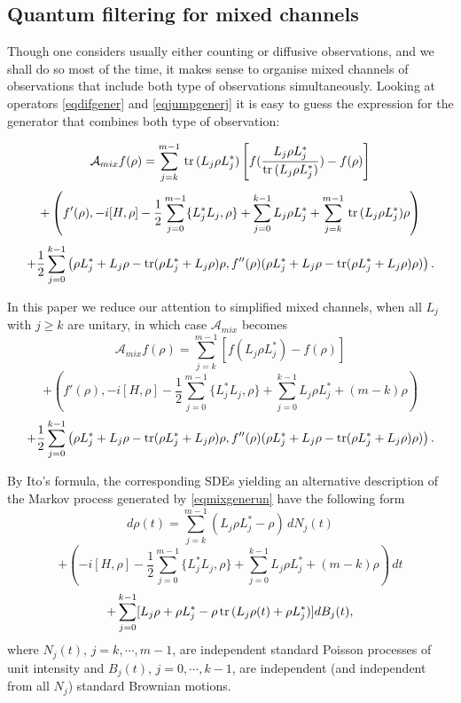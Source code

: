\documentclass[12pt]{article}
\def\AC{\mathcal{A}}
\def\tr{\rm{tr}}
\begin{document}
\subsection{Quantum filtering for mixed channels}

Though one considers usually either counting or diffusive observations, and we shall do so most of the time,
it makes sense to organise mixed channels of observations that include both type of observations simultaneously.
Looking at operators \eqref{eqdifgener} and \eqref{eqjumpgenerj} it is easy to guess the expression for the generator
that combines both type of observation:

\[
\AC_{mix}f(\rho)
=\sum_{j=k}^{m-1} \, {\tr} \, (L_j\rho L_j^*)  \left[f(\frac{ L_j \rho  L_j^*}{ {\tr} \, (L_j\rho L_j^*)})-f(\rho)\right]
\]
\[
+\left(f'(\rho), -i[H, \rho] -\frac12 \sum_{j=0}^{m-1}\{ L_j^* L_j,\rho\}
+\sum_{j=0}^{k-1} L_j \rho  L_j^*
+\sum_{j=k}^{m-1}  \, {\tr} \, (L_j\rho L_j^*) \rho \right)
\]
\begin{equation}
\label{eqmixgener}
+\frac12 \sum_{j=0}^{k-1}  \left(\rho  L_j^* +  L_j\rho- {\tr} (\rho L_j^* +L_j \rho)\rho,
f''(\rho)  (\rho  L_j^* +  L_j\rho- {\tr} (\rho L_j^* +L_j \rho) \rho)\right).
\end{equation}

In this paper we reduce our attention to simplified mixed channels,
when all $L_j$ with $j\ge k$ are unitary,
in which case $\AC_{mix}$ becomes
\[
\AC_{mix}f(\rho)
=\sum_{j=k}^{m-1} \left[f(L_j \rho  L_j^*)-f(\rho)\right]
\]
\[
+\left(f'(\rho), -i[H, \rho] -\frac12 \sum_{j=0}^{m-1}\{ L_j^* L_j,\rho\}
+\sum_{j=0}^{k-1} L_j \rho  L_j^* +(m-k) \rho \right)
\]
\begin{equation}
\label{eqmixgenerun}
+\frac12 \sum_{j=0}^{k-1}  \left(\rho  L_j^* +  L_j\rho- {\tr} (\rho L_j^* +L_j \rho)\rho,
f''(\rho)  (\rho  L_j^* +  L_j\rho- {\tr} (\rho L_j^* +L_j \rho) \rho)\right).
\end{equation}

By Ito's formula, the corresponding SDEs yielding an alternative description
of the Markov process generated by \eqref{eqmixgenerun} have the following form
\[
d\rho(t)=\sum_{j=k}^{m-1} (L_j\rho L_j^*-\rho) \, dN_j(t)
\]
\[
+\left( -i[H, \rho] -\frac12 \sum_{j=0}^{m-1}\{ L_j^* L_j,\rho\}
+\sum_{j=0}^{k-1} L_j \rho  L_j^* +(m-k) \rho \right)\, dt
\]
\begin{equation}
\label{Lindstochmix}
+\sum_{j=0}^{k-1} [L_j\rho+\rho L_j^*-\rho\, {\tr} \, (L_j\rho(t)+\rho L_j^*) ] dB_j(t),
\end{equation}
where $N_j(t)$, $j=k, \cdots, m-1$, are independent standard Poisson processes of unit intensity
and $B_j(t)$, $j=0,\cdots, k-1$, are independent (and independent from all $N_j$) standard Brownian motions.
\end{document}
